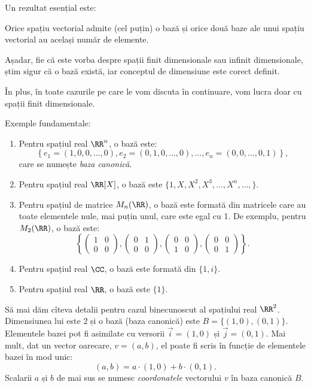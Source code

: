 Un rezultat esențial este:
\begin{theorem}\label{thm:exist-baza}
  Orice spațiu vectorial admite (cel puțin) o bază și orice două baze ale unui
  spațiu vectorial au același număr de elemente.
\end{theorem}

Așadar, fie că este vorba despre spații finit dimensionale sau infinit dimensionale,
știm sigur că o bază există, iar conceptul de dimensiune este corect definit.

În plus, în toate cazurile pe care le vom discuta în continuare, vom lucra
doar cu spații finit dimensionale.

Exemple fundamentale:
\begin{enumerate}
\item Pentru spațiul real $ \RR^n $, o bază este:
  \[
    \left\{ e_1 = (1, 0, 0, \dots, 0), e_2 = (0, 1, 0, \dots, 0), \dots, %
      e_n = (0, 0, \dots, 0, 1) \right\},
  \]
  care se numește \emph{baza canonică}.
\item Pentru spațiul real $ \RR[X] $, o bază este $ \{ 1, X, X^2, X^3, \dots, X^n, \dots, \} $.
\item Pentru spațiul de matrice $ M_n(\RR) $, o bază este formată din matricele
  care au toate elementele nule, mai puțin unul, care este egal cu 1. De exemplu,
  pentru $ M_2(\RR) $, o bază este:
  \[
    \left\{ \begin{pmatrix} 1 & 0 \\ 0 & 0 \end{pmatrix},
      \begin{pmatrix} 0 & 1 \\ 0 & 0 \end{pmatrix},
      \begin{pmatrix} 0 & 0 \\ 1 & 0 \end{pmatrix},
      \begin{pmatrix} 0 & 0 \\ 0 & 1 \end{pmatrix} \right\}.
  \]
\item Pentru spațiul real $ \CC $, o bază este formată din $ \{ 1, i \} $.
\item Pentru spațiul real $ \RR $, o bază este $ \{ 1 \} $.
\end{enumerate}

Să mai dăm cîteva detalii pentru cazul binecunoscut al spațiului real $ \RR^2 $.
Dimensiunea lui este 2 și o bază (baza canonică) este $ B = \{ (1, 0), (0, 1) \} $.
Elementele bazei pot fi asimilate cu versorii $ \vec{i} = (1, 0) $ și $ \vec{j} = (0, 1) $.
Mai mult, dat un vector oarecare, $ v = (a, b) $, el poate fi scris în funcție de elementele
bazei în mod unic:
\[
  (a, b) = a \cdot (1, 0) + b \cdot (0, 1).
\]
Scalarii $ a $ și $ b $ de mai sus se numesc \emph{coordonatele} vectorului $ v $ în
baza canonică $ B $.

